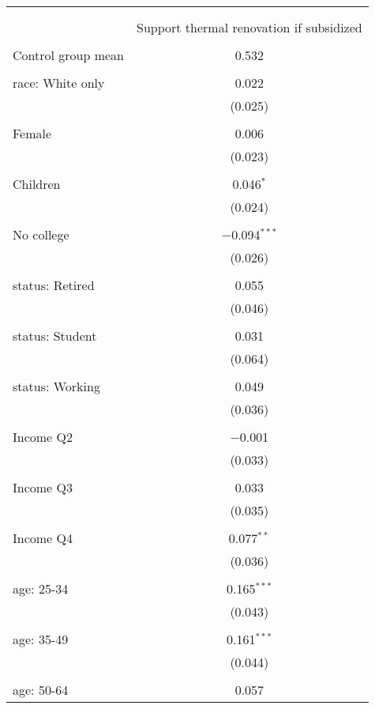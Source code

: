 
\begin{tabular}{@{\extracolsep{5pt}}lc} 
\\[-1.8ex]\hline 
\hline \\[-1.8ex] 
\\[-1.8ex] & Support thermal renovation if subsidized \\ 
\hline \\[-1.8ex] 
 Control group mean & 0.532  \\ \hline \\[-1.8ex] race: White only & 0.022 \\ 
  & (0.025) \\ 
  & \\ 
 Female & 0.006 \\ 
  & (0.023) \\ 
  & \\ 
 Children & 0.046$^{*}$ \\ 
  & (0.024) \\ 
  & \\ 
 No college & $-$0.094$^{***}$ \\ 
  & (0.026) \\ 
  & \\ 
 status: Retired & 0.055 \\ 
  & (0.046) \\ 
  & \\ 
 status: Student & 0.031 \\ 
  & (0.064) \\ 
  & \\ 
 status: Working & 0.049 \\ 
  & (0.036) \\ 
  & \\ 
 Income Q2 & $-$0.001 \\ 
  & (0.033) \\ 
  & \\ 
 Income Q3 & 0.033 \\ 
  & (0.035) \\ 
  & \\ 
 Income Q4 & 0.077$^{**}$ \\ 
  & (0.036) \\ 
  & \\ 
 age: 25-34 & 0.165$^{***}$ \\ 
  & (0.043) \\ 
  & \\ 
 age: 35-49 & 0.161$^{***}$ \\ 
  & (0.044) \\ 
  & \\ 
 age: 50-64 & 0.057 \\ 

\end{tabular}
